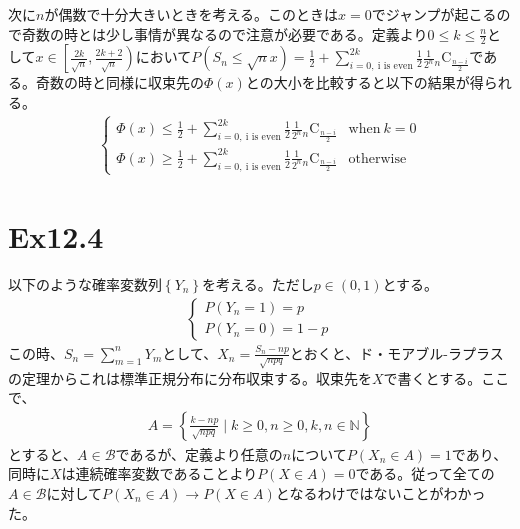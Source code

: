 \documentclass{article}
\begin{document}
次に$n$が偶数で十分大きいときを考える。このときは$x=0$でジャンプが起こるので奇数の時とは少し事情が異なるので注意が必要である。定義より$0\leq k\leq \frac{n}{2}$として$x\in \left[ \frac{2k}{\sqrt{n}}, \frac{2k+2}{\sqrt{n}} \right)$において$P\left( S_n \leq \sqrt{n} x \right) = \frac{1}{2} + \sum_{i=0,\ \text{i is even}}^{2k} \frac{1}{2} \frac{1}{2^n} {}_n \mathrm{C} _\frac{n-i}{2}$である。奇数の時と同様に収束先の$\Phi(x)$との大小を比較すると以下の結果が得られる。
\begin{align*}
	\begin{cases}
	\Phi(x) \leq \frac{1}{2} + \sum_{i=0,\ \text{i is even}}^{2k} \frac{1}{2} \frac{1}{2^n} {}_n \mathrm{C} _\frac{n-i}{2} & \text{when}\ k=0\\[8pt]
	\Phi(x) \geq \frac{1}{2} + \sum_{i=0,\ \text{i is even}}^{2k} \frac{1}{2} \frac{1}{2^n} {}_n \mathrm{C} _\frac{n-i}{2} & \text{otherwise}
	\end{cases}
\end{align*}

\section{Ex12.4}
以下のような確率変数列$\left\{ Y_n \right\}$を考える。ただし$p\in (0,1)$とする。
\begin{align*}
\begin{cases}
	P\left( Y_n = 1 \right) = p\\[8pt]
	P\left( Y_n = 0 \right) = 1-p
\end{cases}
\end{align*}
この時、$S_n = \sum_{m=1}^n Y_m$として、$X_n = \frac{S_n -np}{\sqrt{npq}}$とおくと、ド・モアブル-ラプラスの定理からこれは標準正規分布に分布収束する。収束先を$X$で書くとする。ここで、
\begin{align*}
	A = \left\{ \frac{k-np}{\sqrt{npq}} \mid k \geq 0, n\geq 0, k,n \in \mathbb{N} \right\}
\end{align*}
とすると、$A\in \mathcal{B}$であるが、定義より任意の$n$について$P\left( X_n \in A \right) = 1$であり、同時に$X$は連続確率変数であることより$P\left( X \in A \right) = 0$である。従って全ての$A\in \mathcal{B}$に対して$P\left( X_n \in A \right)\to P\left( X\in A\right)$となるわけではないことがわかった。
\end{document}
